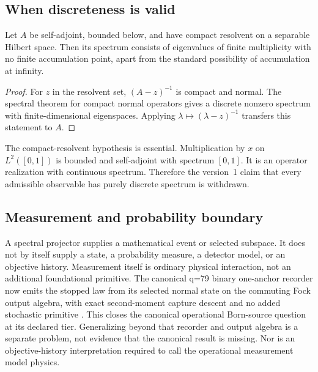 \documentclass[11pt]{article}
\begin{document}
\subsection{When discreteness is valid}

\begin{theorem}\label{thm:compact}
Let $A$ be self-adjoint, bounded below, and have compact resolvent on a
separable Hilbert space.  Then its spectrum consists of eigenvalues of finite
multiplicity with no finite accumulation point, apart from the standard
possibility of accumulation at infinity.
\end{theorem}

\begin{proof}
For $z$ in the resolvent set, $(A-z)^{-1}$ is compact and normal.  The spectral
theorem for compact normal operators gives a discrete nonzero spectrum with
finite-dimensional eigenspaces.  Applying
$\lambda\mapsto(\lambda-z)^{-1}$ transfers this statement to $A$.
\end{proof}

The compact-resolvent hypothesis is essential.  Multiplication by $x$ on
$L^2([0,1])$ is bounded and self-adjoint with spectrum $[0,1]$.  It is an
operator realization with continuous spectrum.  Therefore the version~1
claim that every admissible observable has purely discrete spectrum is
withdrawn.

\subsection{Measurement and probability boundary}
\label{sec:canonical-measurement}

A spectral projector supplies a mathematical event or selected subspace.  It
does not by itself supply a state, a probability measure, a detector model,
or an objective history. Measurement itself is ordinary physical
interaction, not an additional foundational primitive. The canonical
q=79 binary one-anchor recorder now emits the stopped law from its
selected normal state on the commuting Fock output algebra, with exact
second-moment capture descent and no added stochastic primitive
\cite{OwnerQM}. This closes the canonical operational Born-source
question at its declared tier. Generalizing beyond that recorder and
output algebra is a separate problem, not evidence that the canonical
result is missing. Nor is an objective-history interpretation required
to call the operational measurement model physics.
\end{document}
